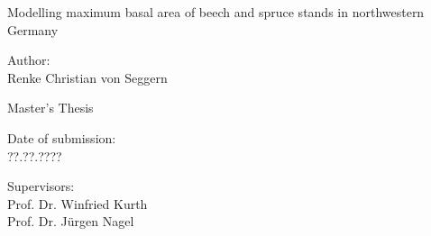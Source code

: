 \begin{titlepage}

\begin{center}

\vspace*{5cm}

{\LARGE Modelling maximum basal area of beech and spruce stands in northwestern Germany \\}

\vspace{2cm}

{\large Author: \\ Renke Christian von Seggern \par}

\vspace{2cm}

{\normalsize Master’s Thesis}

\vspace{0.5cm}

{\normalsize Date of submission: \\ ??.??.???? \par}

\vspace{0.5cm}

{\normalsize Supervisors: \\ Prof. Dr. Winfried Kurth \\ Prof. Dr. Jürgen Nagel \par}

\end{center}

\end{titlepage}

